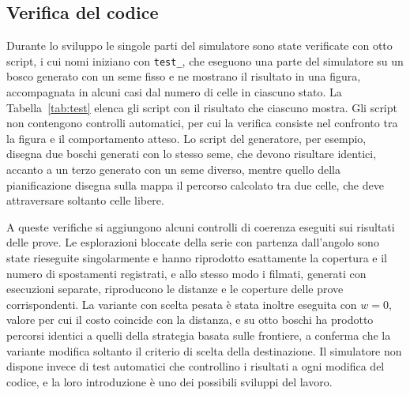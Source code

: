 \subsection{Verifica del codice}
\label{sec:verifica}

Durante lo sviluppo le singole parti del simulatore sono state verificate con otto script, i cui nomi iniziano con \texttt{test\_}, che eseguono una parte del simulatore su un bosco generato con un seme fisso e ne mostrano il risultato in una figura, accompagnata in alcuni casi dal numero di celle in ciascuno stato. La Tabella~\ref{tab:test} elenca gli script con il risultato che ciascuno mostra. Gli script non contengono controlli automatici, per cui la verifica consiste nel confronto tra la figura e il comportamento atteso. Lo script del generatore, per esempio, disegna due boschi generati con lo stesso seme, che devono risultare identici, accanto a un terzo generato con un seme diverso, mentre quello della pianificazione disegna sulla mappa il percorso calcolato tra due celle, che deve attraversare soltanto celle libere.

A queste verifiche si aggiungono alcuni controlli di coerenza eseguiti sui risultati delle prove. Le esplorazioni bloccate della serie con partenza dall'angolo sono state rieseguite singolarmente e hanno riprodotto esattamente la copertura e il numero di spostamenti registrati, e allo stesso modo i filmati, generati con esecuzioni separate, riproducono le distanze e le coperture delle prove corrispondenti. La variante con scelta pesata è stata inoltre eseguita con $w = 0$, valore per cui il costo coincide con la distanza, e su otto boschi ha prodotto percorsi identici a quelli della strategia basata sulle frontiere, a conferma che la variante modifica soltanto il criterio di scelta della destinazione. Il simulatore non dispone invece di test automatici che controllino i risultati a ogni modifica del codice, e la loro introduzione è uno dei possibili sviluppi del lavoro.

